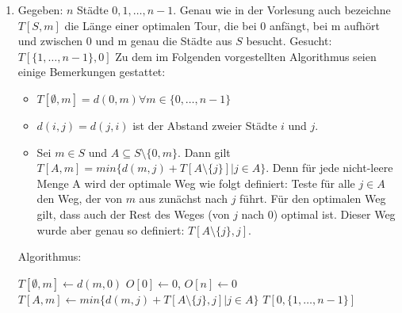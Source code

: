 \documentclass[a4paper,10pt]{scrartcl}
\begin{document}
\begin{enumerate}
 \item
Gegeben: $n$ Städte $0, 1, \hdots, n - 1$. Genau wie in der Vorlesung auch bezeichne $T[S, m]$ die Länge einer optimalen Tour, die bei 0 anfängt, bei m aufhört und zwischen 0 und m genau die Städte aus
$S$ besucht. \newline
Gesucht: $T[\{1, \hdots, n - 1\}, 0]$ \newline
Zu dem im Folgenden vorgestellten Algorithmus seien einige Bemerkungen gestattet:
\begin{itemize}
 \item $T[\emptyset, m] = d(0, m) \forall m \in \{0, \hdots, n - 1\}$
 \item $d(i, j) = d(j, i)$ ist der Abstand zweier Städte $i$ und $j$.
 \item Sei $m \in S$ und $A \subseteq S \setminus \{0, m\}$. Dann gilt $T[A, m] = min\{d(m,j) + T[A \setminus \{ j \}] \left. \right| j \in A\}$. Denn für jede nicht-leere Menge
 A wird der optimale Weg wie folgt definiert: Teste für alle $j \in A$ den Weg, der von $m$ aus zunächst nach $j$ führt. Für den optimalen Weg gilt, dass auch der Rest des Weges (von $j$ nach $0$) optimal ist.
 Dieser Weg wurde aber genau so definiert: $T[A \setminus \{ j \}, j]$.
\end{itemize}

Algorithmus:


  \begin{algorithmic}
      \STATE $T[\emptyset, m] \gets d(m,0)$
   \ENDFOR
  \STATE $O[0] \gets 0$, $O[n] \gets 0$
	  \STATE $T[A,m] \gets min\{d(m, j) + T[A \setminus \{j\}, j] \left. \right|  j \in A\}$
	\ENDIF
      \ENDFOR
    \ENDFOR
  \ENDFOR
  \RETURN $T[0,\{1, \hdots, n - 1\}]$
  \end{algorithmic}

\end{enumerate}
\end{document}
